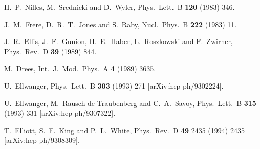 \documentclass[aps,prl,twocolumn,nofootinbib,superscriptaddress]{revtex4}
\begin{document}
{%
%
%

\def\Journal#1#2#3#4{{#1} {\bf #2}, #3 (#4)}
\def\NCA{Nuovo Cimento}
\def\NIM{Nucl. Instrum. Methods}
\def\NIMA{{Nucl. Instrum. Methods} A}
\def\NP{Nucl. Phys.} 
\def\NPB{{Nucl. Phys.} B}
\def\PLB{{Phys. Lett.}  B}
\def\PRL{Phys. Rev. Lett.}
\def\RPP{Rep. Prog. Phys.}
\def\PRD{{Phys. Rev.} D}
\def\PR{Phys. Rep.}
\def\PRP{Prog. Theor. Phys.}
\def\ZPC{{Z. Phys.} C}
\def\MPL{{Mod. Phys. Lett.} A}
\def\EPJC{{Eur. Phys. J.} C}
\def\CPC{Comput. Phys. Commun.}

\renewcommand{\baselinestretch}{1}

\begin{thebibliography}{99}

  H.~P.~Nilles, M.~Srednicki and D.~Wyler,
  Phys.\ Lett.\  B {\bf 120} (1983) 346.

  J.~M.~Frere, D.~R.~T.~Jones and S.~Raby,
  Nucl.\ Phys.\  B {\bf 222} (1983) 11.


  J.~R.~Ellis, J.~F.~Gunion, H.~E.~Haber, L.~Roszkowski and F.~Zwirner,
  Phys.\ Rev.\  D {\bf 39} (1989) 844.

  M.~Drees,
  Int.\ J.\ Mod.\ Phys.\  A {\bf 4} (1989) 3635.

  U.~Ellwanger,
  Phys.\ Lett.\  B {\bf 303} (1993) 271
  [arXiv:hep-ph/9302224].

  U.~Ellwanger, M.~Rausch de Traubenberg and C.~A.~Savoy,
  Phys.\ Lett.\  B {\bf 315} (1993) 331
  [arXiv:hep-ph/9307322].

  T.~Elliott, S.~F.~King and P.~L.~White,
  Phys.\ Rev.\  D {\bf 49} 2435 (1994) 2435
  [arXiv:hep-ph/9308309].


\end{thebibliography}}
\end{document}
